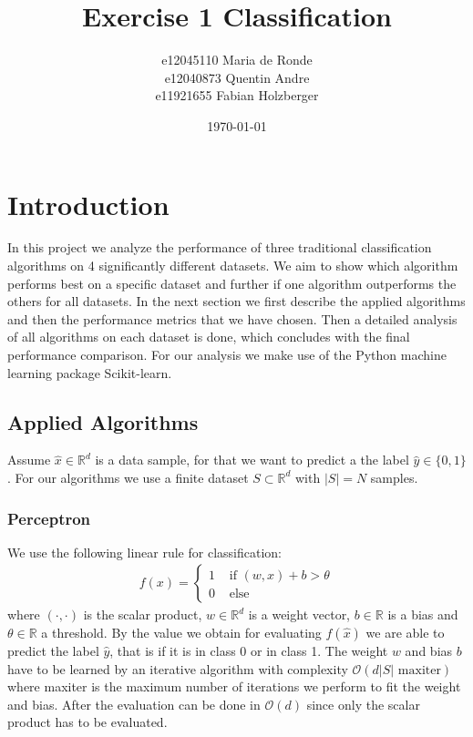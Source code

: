 \documentclass[11pt]{article}
\title{Exercise 1 Classification}
\author{e12045110 Maria de Ronde \\ e12040873  Quentin Andre  \\ e11921655 Fabian Holzberger}
\date{\today}
\begin{document}
\graphicspath{{./figures/}}
\maketitle

%
\section{Introduction}
In this project we analyze the performance of three traditional classification algorithms on 4 significantly different datasets. We aim to show which algorithm performs best on a specific dataset and further if one algorithm outperforms the others for all datasets. In the next section we first describe the applied algorithms and then the performance metrics that we have chosen. Then a detailed analysis of all algorithms on each dataset is done, which concludes with the final performance comparison. For our analysis we make use of the Python machine learning package Scikit-learn.

\subsection{Applied Algorithms}
Assume $\hat{x}\in \mathbb{R}^d$ is a data sample, for that we want to predict a the label $\hat{y}\in \{0,1\}$. For our algorithms we use a finite dataset $S\subset \mathbb{R}^d$ with $|S|=N$ samples.


\subsubsection{Perceptron}\cite{shalev2014}
We use the following linear rule for classification:
\begin{align}
f(x) = 
\begin{cases}
1 & \text{ if } (w,x) +b > \theta\\
0 & \text{ else}
\end{cases}
\end{align}
where $(\cdot,\cdot)$ is the scalar product, $w\in \mathbb{R}^d$ is a weight vector, $b\in\mathbb{R}$ is a bias and $\theta \in \mathbb{R}$ a threshold. By the value we obtain for evaluating $f(\hat{x})$ we are able to predict the label $\hat{y}$, that is if it is in class 0 or in class 1. The weight $w$ and bias $b$ have to be learned by an iterative algorithm with complexity $\mathcal{O}(d |S| \text{ maxiter})$ where maxiter is the maximum number of iterations we perform to fit the weight and bias. After the evaluation can be done in $\mathcal{O}(d)$ since only the scalar product has to be evaluated.
\end{document}
